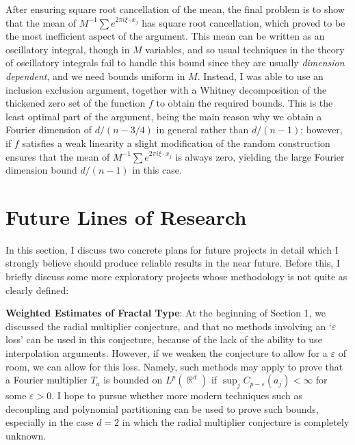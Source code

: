 \documentclass[11pt]{article}
\DeclareMathOperator{\RR}{\mathbb{R}}
\begin{document}
After ensuring square root cancellation of the mean, the final problem is to show that the mean of $M^{-1} \sum e^{2 \pi i \xi \cdot x_j}$ has square root cancellation, which proved to be the most inefficient aspect of the argument. This mean can be written as an oscillatory integral, though in $M$ variables, and so usual techniques in the theory of oscillatory integrals fail to handle this bound since they are usually \emph{dimension dependent}, and we need bounds uniform in $M$. Instead, I was able to use an inclusion exclusion argument, together with a Whitney decomposition of the thickened zero set of the function $f$ to obtain the required bounds. This is the least optimal part of the argument, being the main reason why we obtain a Fourier dimension of $d/(n-3/4)$ in general rather than $d/(n-1)$; however, if $f$ satisfies a weak linearity a slight modification of the random construction ensures that the mean of $M^{-1} \sum e^{2 \pi i \xi \cdot x_j}$ is always zero, yielding the large Fourier dimension bound $d/(n-1)$ in this case. %

\section{Future Lines of Research} \label{Section3}

In this section, I discuss two concrete plans for future projects in detail which I strongly believe should produce reliable results in the near future. Before this, I briefly discuss some more exploratory projects whose methodology is not quite as clearly defined:\vspace{0.3em}

{\bf Weighted Estimates of Fractal Type}: At the beginning of Section 1, we discussed the radial multiplier conjecture, and that no methods involving an `$\varepsilon$ loss' can be used in this conjecture, because of the lack of the ability to use interpolation arguments. However, if we weaken the conjecture to allow for a $\varepsilon$ of room, we can allow for this loss. Namely, such methods may apply to prove that a Fourier multiplier $T_a$ is bounded on $L^p(\RR^d)$ if $\sup_j C_{p - \varepsilon}(a_j) < \infty$ for some $\varepsilon > 0$. I hope to pursue whether more modern techniques such as decoupling and polynomial partitioning can be used to prove such bounds, especially in the case $d = 2$ in which the radial multiplier conjecture is completely unknown.
\end{document}
